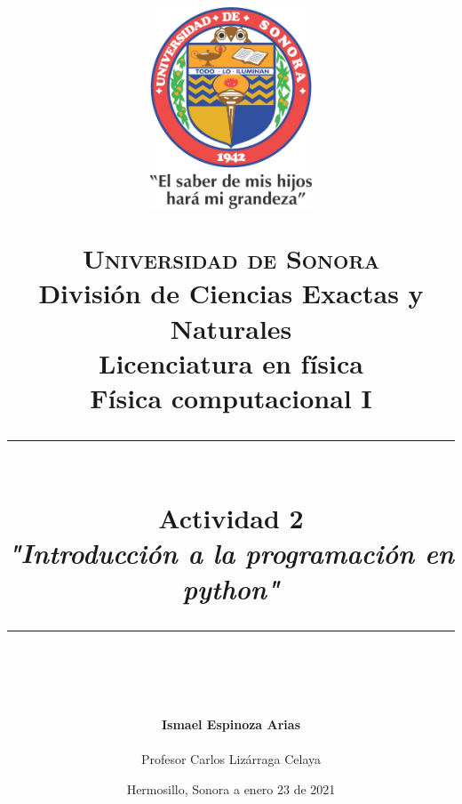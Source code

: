 ﻿\documentclass[12pt]{article}
\newcommand{\HRule}[1]{\rule{\linewidth}{#1}}
\begin{document}
\begin{titlepage}

\title{ \normalsize 
        \begin{center}
        \includegraphics[height=6cm]{Logo.jpg}
        \end{center}
        \LARGE \textsc{\textbf{Universidad de Sonora}} \\ \bigskip
		\Large División de Ciencias Exactas y Naturales \\
        Licenciatura en física \\ \bigskip
        \bigskip
        Física computacional I
		\\ [0.1cm]  
		\HRule{2pt} \\
		\Large \textbf{{Actividad 2}} \\
        \textit{\textbf{"Introducción a la programación en python"}}
		\HRule{2pt} \\
		\normalsize \vspace*{0.001\baselineskip}}
        
\date{\bigskip \Large  \hspace*{\fill} Hermosillo, Sonora a enero 23 de 2021}

        
\author{
		\Large\textbf{ Ismael Espinoza Arias} \\ \bigskip
        \\ \bigskip
       \Large Profesor Carlos Lizárraga Celaya}
       \end{titlepage}
       \maketitle
       

\newpage
\pagestyle{plain}
\end{document}

